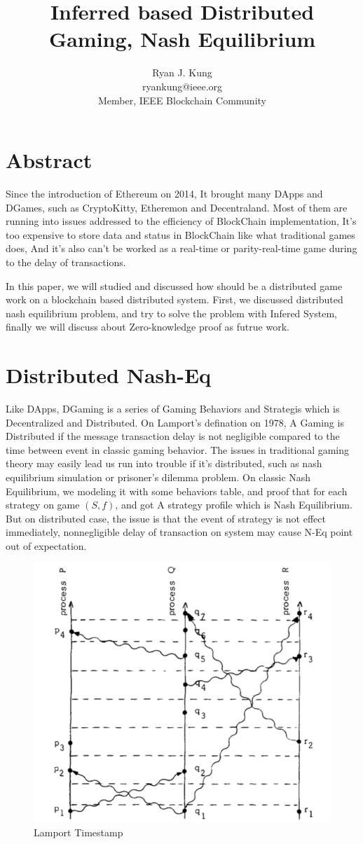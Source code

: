 \documentclass[twocolumn]{article}
\author{Ryan J. Kung \\ryankung@ieee.org\\Member, IEEE Blockchain Community }
\title{Inferred based Distributed Gaming, Nash Equilibrium}
\begin{document}
\maketitle
\section{Abstract}

Since the introduction of Ethereum on 2014\cite{ethereum}, It brought many DApps and DGames, such as CryptoKitty, Etheremon and Decentraland. Most of them are running into issues addressed to the efficiency of BlockChain implementation, It's too expensive to store data and status in BlockChain like what traditional games does, And it's also can't be worked as a real-time or parity-real-time game during to the delay of transactions. \cite{mrx05}

In this paper, we will studied and discussed how should be a distributed game work on a blockchain based distributed system. First, we discussed distributed nash equilibrium problem, and try to solve the problem with Infered System, finally we will discuss about Zero-knowledge proof as futrue work.

\section{Distributed Nash-Eq}

Like DApps, DGaming is a series of Gaming Behaviors and Strategis which is Decentralized and Distributed. On Lamport's defination on 1978\cite{time-clocks-ordering-events-distributed-system}, A Gaming is Distributed if the message transaction delay is not negligible compared to the time between event in classic gaming behavior. The issues in traditional gaming theory may easily lead us run into trouble if it's distributed, such as nash equilibrium simulation or prisoner's dilemma problem.
On classic Nash Equilibrium, we modeling it with some behaviors table, and proof that for each strategy on game $(S, f)$, and got A strategy profile which is Nash Equilibrium. But on distributed case, the issue is that the event of strategy is not effect immediately, nonnegligible delay of transaction on system may cause N-Eq point out of expectation.



\begin{figure}[H]
  \centering
  \includegraphics[width=0.5\linewidth]{img/lamportts.png}
  \caption{Lamport Timestamp}
\end{figure}
\end{document}
